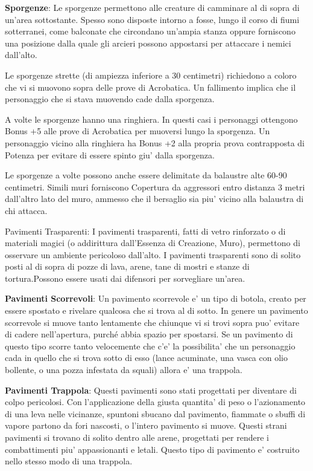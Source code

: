 \documentclass[a4paper,11pt,twoside,openany]{dndbook}
\begin{document}
{\textbf{Sporgenze}: Le sporgenze permettono alle creature di camminare al di sopra di un'area sottostante. Spesso sono disposte intorno a fosse, lungo il corso di fiumi sotterranei, come balconate che circondano un'ampia stanza oppure forniscono una posizione dalla quale gli arcieri possono appostarsi per attaccare i nemici dall'alto. 

Le sporgenze strette (di ampiezza inferiore a 30 centimetri) richiedono a coloro che vi si muovono sopra delle prove di Acrobatica. Un fallimento implica che il personaggio che si stava muovendo cade dalla sporgenza.

A volte le sporgenze hanno una ringhiera. In questi casi i personaggi ottengono Bonus +5 alle prove di Acrobatica per muoversi lungo la sporgenza. Un personaggio vicino alla ringhiera ha Bonus +2 alla propria prova contrapposta di Potenza per evitare di essere spinto giu' dalla sporgenza. 

Le sporgenze a volte possono anche essere delimitate da balaustre alte 60-90 centimetri. Simili muri forniscono Copertura da aggressori entro distanza 3 metri dall'altro lato del muro, ammesso che il bersaglio sia piu' vicino alla balaustra di chi attacca.

Pavimenti Trasparenti: I pavimenti trasparenti, fatti di vetro rinforzato o di materiali magici (o addirittura dall'Essenza di Creazione, Muro), permettono di osservare un ambiente pericoloso dall'alto. I pavimenti trasparenti sono di solito posti al di sopra di pozze di lava, arene, tane di mostri e stanze di tortura.Possono essere usati dai difensori 
per sorvegliare un'area.

\textbf{Pavimenti Scorrevoli}: Un pavimento scorrevole e' un tipo di botola, creato per essere spostato e rivelare qualcosa che si trova al di sotto. In genere un pavimento scorrevole si muove tanto lentamente che chiunque vi si trovi sopra puo' evitare di cadere nell'apertura, purché abbia spazio per spostarsi. Se un pavimento di questo tipo scorre tanto velocemente che c'e' la possibilita' che un personaggio cada in quello che si trova sotto di esso (lance acuminate, una vasca con olio bollente, o una pozza infestata da squali) allora e' una trappola.

\textbf{Pavimenti Trappola}: Questi pavimenti sono stati progettati per diventare di colpo pericolosi. Con l'applicazione della giusta quantita' di peso o l'azionamento di una leva nelle vicinanze, spuntoni sbucano dal pavimento, fiammate o sbuffi di vapore partono da fori nascosti, o l'intero pavimento si muove. Questi strani pavimenti si trovano di solito dentro alle arene, progettati per rendere i combattimenti piu' appassionanti e letali. Questo tipo di pavimento e' costruito nello stesso modo di una trappola.

}
\end{document}
